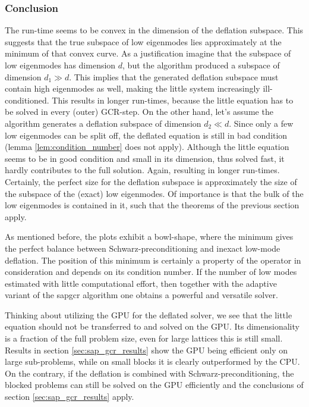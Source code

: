 \documentclass{article}
\theoremstyle{plain} %
\theoremstyle{convention} %
\theoremstyle{remark} %
\numberwithin{equation}{section}
\begin{document}
\subsubsection{Conclusion}

The run-time seems to be convex in the dimension of the deflation subspace. This suggests that the true subspace of low eigenmodes lies approximately at the minimum of that convex curve. As a justification imagine that the subspace of low eigenmodes has dimension $d$, but the algorithm produced a subspace of dimension $d_1 \gg d$. This implies that the generated deflation subspace must contain high eigenmodes as well, making the little system increasingly ill-conditioned. This results in longer run-times, because the little equation has to be solved in every (outer) GCR-step. On the other hand, let's assume the algorithm generates a deflation subspace of dimension $d_2 \ll d$. Since only a few low eigenmodes can be split off, the deflated equation is still in bad condition (lemma \ref{lem:condition_number} does not apply). Although the little equation seems to be in good condition and small in its dimension, thus solved fast, it hardly contributes to the full solution. Again, resulting in longer run-times. Certainly, the perfect size for the deflation subspace is approximately the size of the subspace of the (exact) low eigenmodes. Of importance is that the bulk of the low eigenmodes is contained in it, such that the theorems of the previous section apply.

As mentioned before, the plots exhibit a bowl-shape, where the minimum gives the perfect balance between Schwarz-preconditioning and inexact low-mode deflation. The position of this minimum is certainly a property of the operator in consideration and depends on its condition number. If the number of low modes estimated with little computational effort, then together with the adaptive variant of the \acrshort*{sapgcr} algorithm one obtains a powerful and versatile solver.

Thinking about utilizing the GPU for the deflated solver, we see that the little equation should not be transferred to and solved on the GPU. Its dimensionality is a fraction of the full problem size, even for large lattices this is still small. Results in section \ref{sec:sap_gcr_results} show the GPU being efficient only on large sub-problems, while on small blocks it is clearly outperformed by the CPU. On the contrary, if the deflation is combined with Schwarz-preconditioning, the blocked problems can still be solved on the GPU efficiently and the conclusions of section \ref{sec:sap_gcr_results} apply.
\end{document}
